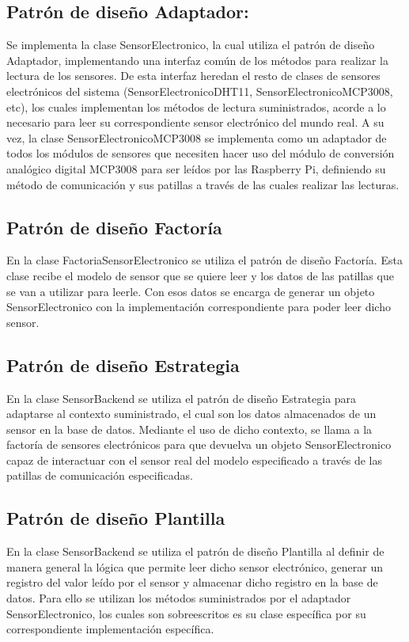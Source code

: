     \subsection{Patrón de diseño Adaptador:}
        Se implementa la clase SensorElectronico, la cual utiliza el patrón de diseño Adaptador, implementando una interfaz común de los métodos para realizar la lectura de los sensores. De esta interfaz heredan el resto de clases de sensores electrónicos del sistema (SensorElectronicoDHT11, SensorElectronicoMCP3008, etc), los cuales implementan los métodos de lectura suministrados, acorde a lo necesario para leer su correspondiente sensor electrónico del mundo real.
        A su vez, la clase SensorElectronicoMCP3008 se implementa como un adaptador de todos los módulos de sensores que necesiten hacer uso del módulo de conversión analógico digital MCP3008 para ser leídos por las Raspberry Pi, definiendo su método de comunicación y sus patillas a través de las cuales realizar las lecturas. 
    
    \subsection{Patrón de diseño Factoría}
        En la clase FactoriaSensorElectronico se utiliza el patrón de diseño Factoría. Esta clase recibe el modelo de sensor que se quiere leer y los datos de las patillas que se van a utilizar para leerle. Con esos datos se encarga de generar un objeto SensorElectronico con la implementación correspondiente para poder leer dicho sensor.
    
    \subsection{Patrón de diseño Estrategia}
        En la clase SensorBackend se utiliza el patrón de diseño Estrategia para adaptarse al contexto suministrado, el cual son los datos almacenados de un sensor en la base de datos. Mediante el uso de dicho contexto, se llama a la factoría de sensores electrónicos para que devuelva un objeto SensorElectronico capaz de interactuar con el sensor real del modelo especificado a través de las patillas de comunicación especificadas. 
    
    \subsection{Patrón de diseño Plantilla}
        En la clase SensorBackend se utiliza el patrón de diseño Plantilla al definir de manera general la lógica que permite leer dicho sensor electrónico, generar un registro del valor leído por el sensor y almacenar dicho registro en la base de datos. Para ello se utilizan los métodos suministrados por el adaptador SensorElectronico, los cuales son sobreescritos es su clase específica por su correspondiente implementación específica.
    
